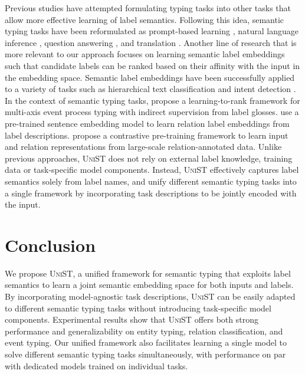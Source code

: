 \documentclass[11pt]{article}
\newcommand{\model}{\textsc{UniST}\xspace}
\newcommand{\stitle}[1]{\vspace{1ex} \noindent{\bf #1}}
\begin{document}
\stitle{Learning Label Semantics.} Previous studies have attempted formulating typing tasks into other tasks that allow more effective learning of label semantics. Following this idea, semantic typing tasks have been reformulated as prompt-based learning \cite{ding2021prompt, han2021ptr}, natural language inference \cite{yin-etal-2019-benchmarking, sainz-etal-2021-label}, question answering \cite{levy-etal-2017-zero, li-etal-2019-entity, du-cardie-2020-event}, and translation \cite{paolini2021structured}. Another line of research that is more relevant to our approach focuses on learning semantic label embeddings such that candidate labels can be ranked based on their affinity with the input in the embedding space. Semantic label embeddings have been successfully applied to a variety of tasks such as hierarchical text classification \cite{chen-etal-2021-hierarchy, shen-etal-2021-taxoclass} and intent detection \cite{xia-etal-2018-zero}. In the context of semantic typing tasks, \citet{chen-etal-2020-trying} propose a learning-to-rank framework for multi-axis event process typing with indirect supervision from label glosses. \citet{chen-li-2021-zs} use a pre-trained sentence embedding model to learn relation label embeddings from label descriptions. \citet{dong-etal-2021-mapre} propose a contrastive pre-training framework to learn input and relation representations from large-scale relation-annotated data. Unlike previous approaches, \model does not rely on external label knowledge, training data or task-specific model components. Instead, \model effectively captures label semantics solely from label names, and unify different semantic typing tasks into a single framework by incorporating task descriptions to be jointly encoded with the input. 
\section{Conclusion}

We propose \model, a unified framework for semantic typing that exploits label semantics to learn a joint semantic embedding space for both inputs and labels. By incorporating model-agnostic task descriptions, \model can be easily adapted to different semantic typing tasks without introducing task-specific model components. Experimental results show that \model offers both strong performance and generalizability on entity typing, relation classification, and event typing. Our unified framework also facilitates learning a single model to solve different semantic typing tasks simultaneously, with performance on par with dedicated models trained on individual tasks. 
\end{document}
